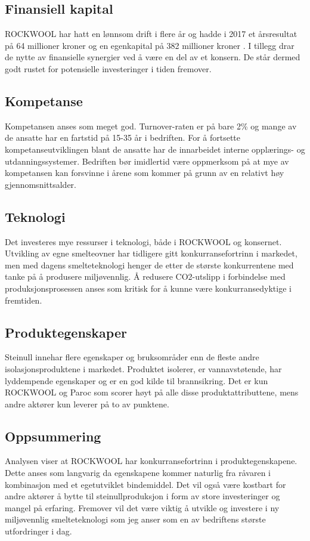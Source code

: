 \subsection{Finansiell kapital}
ROCKWOOL har hatt en lønnsom drift i flere år og hadde i 2017 et årsresultat på 64 millioner kroner og en egenkapital på 382 millioner kroner \cite{ProffRegnskap}. I tillegg drar de nytte av finansielle synergier ved å være en del av et konsern. De står dermed godt rustet for potensielle investeringer i tiden fremover.

\subsection{Kompetanse}
Kompetansen anses som meget god. Turnover-raten er på bare 2\% og mange av de ansatte har en fartstid på 15-35 år i bedriften. For å fortsette kompetanseutviklingen blant de ansatte har de innarbeidet interne opplærings- og utdanningssystemer. Bedriften bør imidlertid være oppmerksom på at mye av kompetansen kan forsvinne i årene som kommer på grunn av en relativt høy gjennomsnittsalder.

\subsection{Teknologi}
Det investeres mye ressurser i teknologi, både i ROCKWOOL og konsernet. Utvikling av egne smelteovner har tidligere gitt konkurransefortrinn i markedet, men med dagens smelteteknologi henger de etter de største konkurrentene med tanke på å produsere miljøvennlig. Å redusere CO2-utslipp i forbindelse med produksjonsprosessen anses som kritisk for å kunne være konkurransedyktige i fremtiden.

\subsection{Produktegenskaper}
Steinull innehar flere egenskaper og bruksområder enn de fleste andre isolasjonsproduktene i markedet. Produktet isolerer, er vannavstøtende, har lyddempende egenskaper og er en god kilde til brannsikring. Det er kun ROCKWOOL og Paroc som scorer høyt på alle disse produktattributtene, mens andre aktører kun leverer på to av punktene.

\subsection{Oppsummering}
Analysen viser at ROCKWOOL har konkurransefortrinn i produktegenskapene. Dette anses som langvarig da egenskapene kommer naturlig fra råvaren i kombinasjon med et egetutviklet bindemiddel. Det vil også være kostbart for andre aktører å bytte til steinullproduksjon i form av store investeringer og mangel på erfaring. Fremover vil det være viktig å utvikle og investere i ny miljøvennlig smelteteknologi som jeg anser som en av bedriftens største utfordringer i dag.